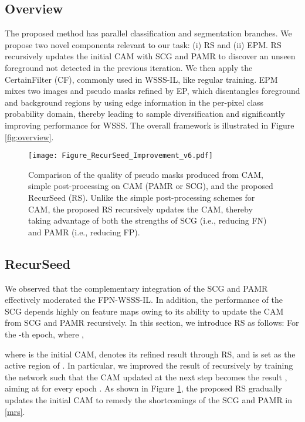 \documentclass[11pt]{article}
\begin{document}
\subsection{Overview} 

The proposed method has parallel classification and segmentation branches. We propose two novel components relevant to our task: (i) RS and (ii) EPM. RS recursively updates the initial CAM with SCG and PAMR to discover an unseen foreground not detected in the previous iteration. {We then apply the CertainFilter (CF), commonly used in WSSS-IL, like regular training. EPM mixes two images and pseudo masks refined by EP, which disentangles foreground and background regions by using edge information in the per-pixel class probability domain, thereby leading to sample diversification and significantly improving performance for WSSS.} The overall framework is illustrated in Figure \ref{fig:overview}.


\begin{figure}[t]\centering \texttt{[image: Figure\_RecurSeed\_Improvement\_v6.pdf]}
\caption{
        Comparison of the quality of pseudo masks produced from CAM, simple post-processing on CAM (PAMR or SCG), and the proposed RecurSeed (RS). Unlike the simple post-processing schemes for CAM, the proposed RS recursively updates the CAM, thereby taking advantage of both the strengths of SCG (i.e., reducing FN) and PAMR (i.e., reducing FP).
    }
    \label{fig:rs}


\end{figure}

\subsection{RecurSeed}
\label{section:recurseed}
We observed that the complementary integration of the SCG and PAMR effectively moderated the FPN-WSSS-IL. 
In addition, the performance of the SCG depends highly on feature maps owing to its ability to update the CAM from SCG and PAMR recursively. In this section, we introduce RS  as follows: For the -th epoch, where ,
 
where  is the initial CAM,  denotes {its refined result through RS}, and { is set as the active region of }. 
In particular, we improved the result of  recursively by training the network such that the CAM updated at the next step  becomes the result , aiming at  for every epoch . As shown in Figure \ref{fig:rs}, the proposed RS gradually updates the initial CAM to remedy the shortcomings of the SCG and PAMR in \eqref{mrs}.
\end{document}
